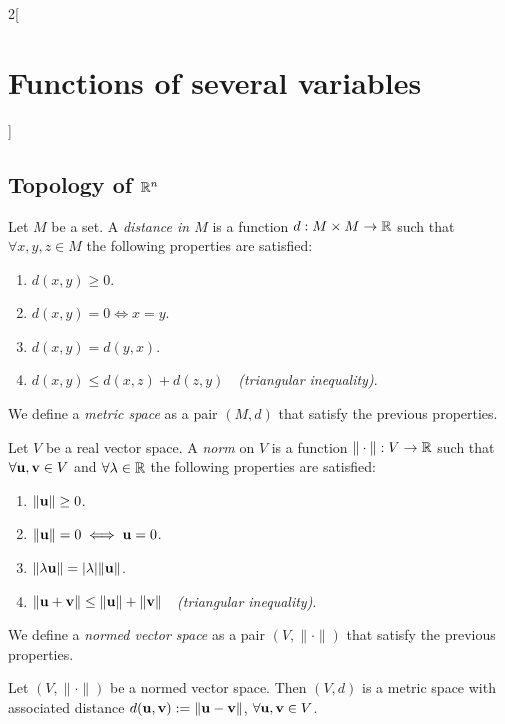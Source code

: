 \documentclass[../../../main.tex]{subfiles}
\begin{document}
\begin{multicols}{2}[\section{Functions of several variables}]
  \subsection{Topology of \texorpdfstring{$\mathbb{R}^n$}{Rn}}
  \begin{definition}
    Let $M$ be a set. A \textit{distance in $M$} is a function $d:M\times M\rightarrow\mathbb{R} $ such that $\forall x,y,z\in M$ the following properties are satisfied:
    \begin{enumerate}
      \item $d(x,y)\geq 0$.
      \item $d(x,y)=0\iff x=y$.
      \item $d(x,y)=d(y,x)$.
      \item $d(x,y)\leq d(x,z)+d(z,y)\quad$\textit{(triangular inequality)}.
    \end{enumerate}
    We define a \textit{metric space} as a pair $(M,d)$ that satisfy the previous properties.
    \label{FOSV_metric}
  \end{definition}
  \begin{definition}\label{FOSV_norm}
    Let $V$ be a real vector space. A \textit{norm} on $V$ is a function $\|\cdot\|:V\rightarrow\mathbb{R} $ such that $\forall \boldsymbol{\mathrm{u}},\boldsymbol{\mathrm{v}}\in V$ and $\forall\lambda\in\mathbb{R} $ the following properties are satisfied:
    \begin{enumerate}
      \item $\|\boldsymbol{\mathrm{u}}\|\geq 0$.
      \item $\|\boldsymbol{\mathrm{u}}\|=0\iff \boldsymbol{\mathrm{u}}=0$.
      \item $\|\lambda \boldsymbol{\mathrm{u}}\|=|\lambda|\|\boldsymbol{\mathrm{u}}\|$.
      \item $\|\boldsymbol{\mathrm{u}}+\boldsymbol{\mathrm{v}}\|\leq \|\boldsymbol{\mathrm{u}}\|+\|\boldsymbol{\mathrm{v}}\|\quad$\textit{(triangular inequality)}.
    \end{enumerate}
    We define a \textit{normed vector space} as a pair $(V,\|\cdot\|)$ that satisfy the previous properties.
  \end{definition}
  \begin{prop}
    Let $(V,\|\cdot\|)$ be a normed vector space. Then $(V,d)$ is a metric space with associated distance $d(\boldsymbol{\mathrm{u}},\boldsymbol{\mathrm{v}}):=\|\boldsymbol{\mathrm{u}}-\boldsymbol{\mathrm{v}}\|$, $\forall \boldsymbol{\mathrm{u}},\boldsymbol{\mathrm{v}}\in V$.

\end{prop}
\end{multicols}
\end{document}
